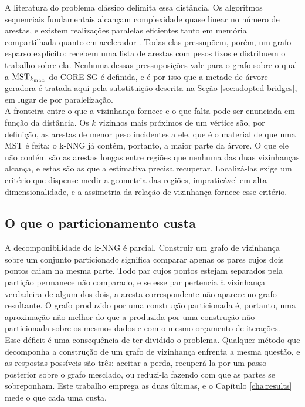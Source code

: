 A literatura do problema clássico delimita essa distância. Os algoritmos sequenciais fundamentais \cite{prim,kruskal} alcançam complexidade quase linear no número de arestas, e existem realizações paralelas eficientes tanto em memória compartilhada \cite{parallel-mst} quanto em acelerador \cite{gpu-mst}. Todas elas pressupõem, porém, um grafo esparso explícito: recebem uma lista de arestas com pesos fixos e distribuem o trabalho sobre ela. Nenhuma dessas pressuposições vale para o grafo sobre o qual a $\mathrm{MST}_{k_{max}}$ do \ac{CORE-SG} é definida, e é por isso que a metade de árvore geradora é tratada aqui pela substituição descrita na Seção \ref{sec:adopted-bridges}, em lugar de por paralelização.\\

A fronteira entre o que a vizinhança fornece e o que falta pode ser enunciada em função da distância. Os $k$ vizinhos mais próximos de um vértice são, por definição, as arestas de menor peso incidentes a ele, que é o material de que uma \ac{MST} é feita; o \ac{k-NNG} já contém, portanto, a maior parte da árvore. O que ele não contém são as arestas longas entre regiões que nenhuma das duas vizinhanças alcança, e estas são as que a estimativa precisa recuperar. Localizá-las exige um critério que dispense medir a geometria das regiões, impraticável em alta dimensionalidade, e a assimetria da relação de vizinhança fornece esse critério.\\

\subsection{O que o particionamento custa\label{sec:problem-partition-cost}}

A decomponibilidade do \ac{k-NNG} é parcial. Construir um grafo de vizinhança sobre um conjunto particionado significa comparar apenas os pares cujos dois pontos caiam na mesma parte. Todo par cujos pontos estejam separados pela partição permanece não comparado, e se esse par pertencia à vizinhança verdadeira de algum dos dois, a aresta correspondente não aparece no grafo resultante. O grafo produzido por uma construção particionada é, portanto, uma aproximação não melhor do que a produzida por uma construção não particionada sobre os mesmos dados e com o mesmo orçamento de iterações.\\

Esse déficit é uma consequência de ter dividido o problema. Qualquer método que decomponha a construção de um grafo de vizinhança enfrenta a mesma questão, e as respostas possíveis são três: aceitar a perda, recuperá-la por um passo posterior sobre o grafo mesclado, ou reduzi-la fazendo com que as partes se sobreponham. Este trabalho emprega as duas últimas, e o Capítulo \ref{cha:results} mede o que cada uma custa.\\

